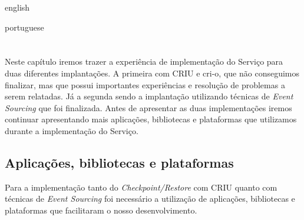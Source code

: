 

\begin{otherlanguage*}{english}


\begin{otherlanguage*}{portuguese}

\chapter{} \label{cap:implementacao:servico}

Neste capítulo iremos trazer a experiência de implementação do Serviço para duas
diferentes implantações. A primeira com CRIU e cri-o, que não conseguimos finalizar,
mas que possui importantes experiências e resolução de problemas a serem relatadas. Já
a segunda sendo a implantação utilizando técnicas de \textit{Event Sourcing} que foi
finalizada. Antes de apresentar as duas implementações iremos continuar apresentando
mais aplicações, bibliotecas e plataformas que utilizamos durante a implementação do
Serviço.

\section{Aplicações, bibliotecas e plataformas}

Para a implementação tanto do \textit{Checkpoint/Restore} com CRIU quanto com técnicas
de \textit{Event Sourcing} foi necessário a utilização de aplicações, bibliotecas e
plataformas que facilitaram o nosso desenvolvimento.


\end{otherlanguage*}
\end{otherlanguage*}
